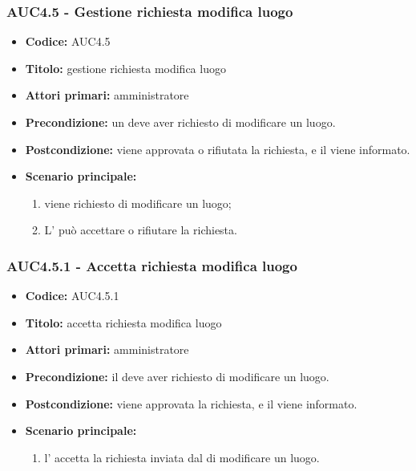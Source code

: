 \documentclass[casi-duso]{subfiles}
\begin{document}
\subsubsection{AUC4.5 - Gestione richiesta modifica luogo}
\label{subsub:AUC4.5}
\begin{itemize}
  \item \textbf{Codice:} AUC4.5
  \item \textbf{Titolo:} gestione richiesta modifica luogo
  \item \textbf{Attori primari:} amministratore
  \item \textbf{Precondizione:} un  deve aver richiesto di modificare un luogo.
  \item \textbf{Postcondizione:} viene approvata o rifiutata la richiesta, e il  viene informato.
  \item \textbf{Scenario principale:} 
  \begin{enumerate}
    \item viene richiesto di modificare un luogo;
    \item L' può accettare o rifiutare la richiesta.
  \end{enumerate}
\end{itemize}

\subsubsection{AUC4.5.1 - Accetta richiesta modifica luogo}
\label{subsub:AUC4.5.1}
\begin{itemize}
  \item \textbf{Codice:} AUC4.5.1
  \item \textbf{Titolo:} accetta richiesta modifica luogo
  \item \textbf{Attori primari:} amministratore
  \item \textbf{Precondizione:} il  deve aver richiesto di modificare un luogo.
  \item \textbf{Postcondizione:} viene approvata la richiesta, e il  viene informato.
  \item \textbf{Scenario principale:} 
  \begin{enumerate}
    \item  l' accetta la richiesta inviata dal  di modificare un luogo.
  \end{enumerate}
\end{itemize}
\end{document}
